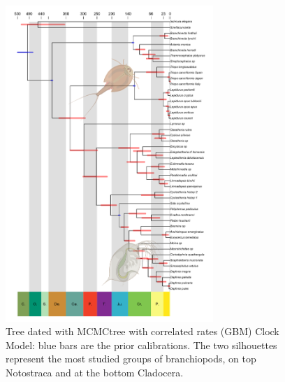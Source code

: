 \begin{figure}[h!]
    \centering
    \includegraphics[width=0.7\textwidth]{Figures/mcmctree_gbm_2.0.png}
    \caption[Tree dated with MCMCtree with GBM Clock Model]{Tree dated with MCMCtree with correlated rates (GBM) Clock Model: blue bars are the prior calibrations. The two silhouettes represent the most studied groups of branchiopods, on top Notostraca and at the bottom Cladocera.
}
    \label{fig:mcmctree_gbm}
\end{figure}


